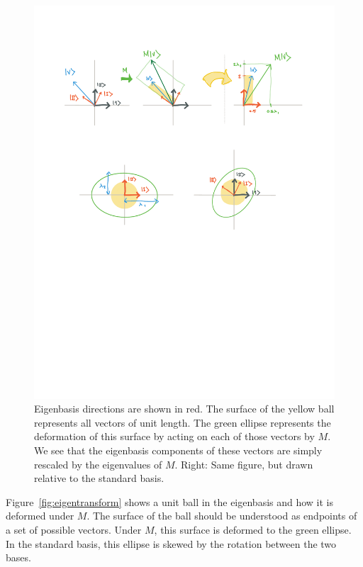 \documentclass[12pt, oneside]{report}    %
\begin{document}
\begin{figure}[tb]
    \centering
    \includegraphics[width=.8\textwidth]{figures/eigen_ball.pdf}
    \caption{Eigenbasis directions are shown in red. The surface of the yellow ball represents all vectors of unit length. The green ellipse represents the deformation of this surface by acting on each of those vectors by $M$. We see that the eigenbasis components of these vectors are simply rescaled by the eigenvalues of $M$. Right: Same figure, but drawn relative to the standard basis.}
    \label{fig:eigenbal}
\end{figure}

Figure~\ref{fig:eigentransform} shows a unit ball in the eigenbasis and how it is deformed under $M$. The surface of the ball should be understood as endpoints of a set of possible vectors. Under $M$, this surface is deformed to the green ellipse. In the standard basis, this ellipse is skewed by the rotation between the two bases. 
\end{document}
